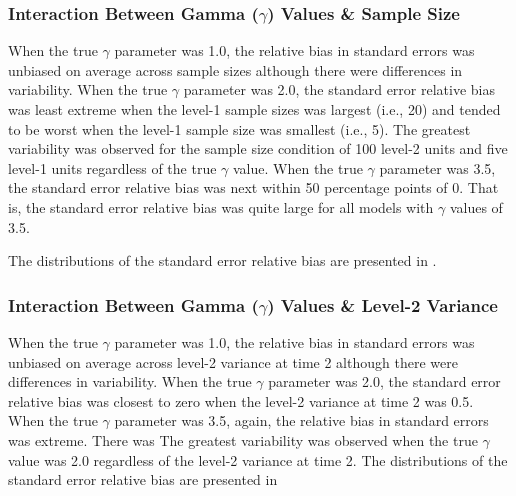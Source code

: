 \documentclass[man, noextraspace, floatsintext, 12pt]{apa7}
\begin{document}
\subsubsection*{Interaction Between Gamma ($\gamma$) Values \& Sample Size}
When the true $\gamma$ parameter was 1.0, the relative bias in standard errors was unbiased on average across sample sizes although there were differences in variability. When the true $\gamma$ parameter was 2.0, the standard error relative bias was least extreme when the level-1 sample sizes was largest (i.e., 20) and tended to be worst when the level-1 sample size was smallest (i.e., 5). The greatest variability was observed for the sample size condition of 100 level-2 units and five level-1 units regardless of the true $\gamma$ value. When the true $\gamma$ parameter was 3.5, the standard error relative bias was next within 50 percentage points of 0. That is, the standard error relative bias was quite large for all models with $\gamma$ values of 3.5.

The distributions of the standard error relative bias are presented in .



\subsubsection*{Interaction Between Gamma ($\gamma$) Values \& Level-2 Variance}
When the true $\gamma$ parameter was 1.0, the relative bias in standard errors was unbiased on average across level-2 variance at time 2 although there were differences in variability. When the true $\gamma$ parameter was 2.0, the standard error relative bias was closest to zero when the level-2 variance at time 2 was 0.5. When the true $\gamma$ parameter was 3.5, again, the relative bias in standard errors was extreme. There was The greatest variability was observed when the true $\gamma$ value was 2.0 regardless of the level-2 variance at time 2. The distributions of the standard error relative bias are presented in
\end{document}
